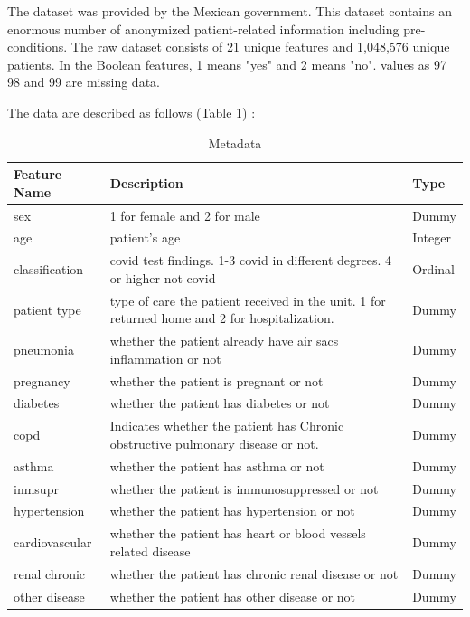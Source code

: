 \documentclass[
  journal=medium,
  manuscript=Report,
  year=2023,
  volume=37,
]{cup-journal}
\begin{document}
The dataset was provided by the Mexican government. This dataset contains an enormous number of anonymized patient-related information including pre-conditions. The raw dataset consists of 21 unique features and 1,048,576 unique patients. In the Boolean features, 1 means "yes" and 2 means "no". values as 97 98 and 99 are missing data.

The data are described as follows (Table \ref{attribute}) :

\begin{table}[hbt!]
    \begin{threeparttable}
    \caption{Metadata}
    \label{attribute}
    \begin{tabular}{lll}
    \toprule
    \headrow Feature Name & Description & Type \\
    \midrule
    sex & 1 for female and 2 for male & Dummy \\ 
    \midrule
    age & patient's age & Integer \\ 
    \midrule
    classification & covid test findings. 1-3 covid in different degrees. 4 or higher not covid & Ordinal \\ 
    \midrule
    patient type & type of care the patient received in the unit. 1 for returned home and 2 for hospitalization. & Dummy \\ 
    \midrule
    pneumonia & whether the patient already have air sacs inflammation or not  & Dummy \\ 
    \midrule
    pregnancy & whether the patient is pregnant or not & Dummy \\ 
    \midrule
    diabetes & whether the patient has diabetes or not & Dummy \\ 
    \midrule
    copd & Indicates whether the patient has Chronic obstructive pulmonary disease or not. & Dummy \\ 
    \midrule
    asthma & whether the patient has asthma or not & Dummy \\ 
    \midrule
    inmsupr & whether the patient is immunosuppressed or not & Dummy \\ 
    \midrule
    hypertension &  whether the patient has hypertension or not & Dummy \\ 
    \midrule
    cardiovascular &  whether the patient has heart or blood vessels related disease & Dummy \\ 
    \midrule
    renal chronic &  whether the patient has chronic renal disease or not & Dummy \\ 
    \midrule
    other disease &  whether the patient has other disease or not & Dummy \\ 

\end{tabular}
\end{threeparttable}
\end{table}
\end{document}
